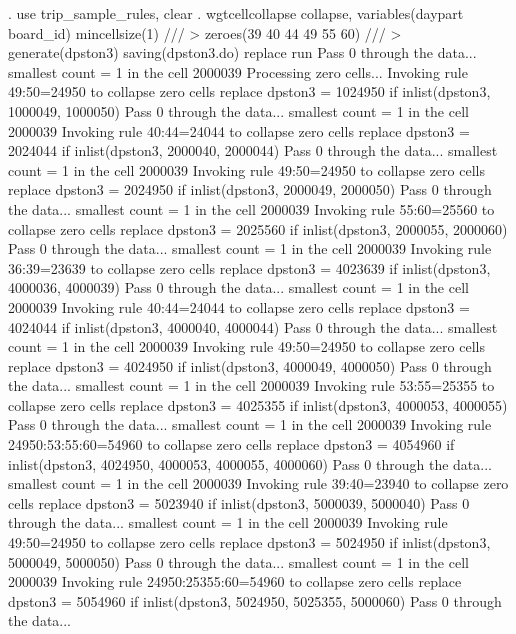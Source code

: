 . use trip_sample_rules, clear
{\smallskip}
. wgtcellcollapse collapse, variables(daypart board_id) mincellsize(1) ///
>         zeroes(39 40 44 49 55 60) ///
>         generate(dpston3) saving(dpston3.do) replace run
Pass 0 through the data...
  smallest count = 1 in the cell      2000039
{\smallskip}
Processing zero cells...
{\smallskip}
  Invoking rule 49:50=24950 to collapse zero cells
  replace dpston3 = 1024950 if inlist(dpston3, 1000049, 1000050)
Pass 0 through the data...
  smallest count = 1 in the cell      2000039
  Invoking rule 40:44=24044 to collapse zero cells
  replace dpston3 = 2024044 if inlist(dpston3, 2000040, 2000044)
Pass 0 through the data...
  smallest count = 1 in the cell      2000039
  Invoking rule 49:50=24950 to collapse zero cells
  replace dpston3 = 2024950 if inlist(dpston3, 2000049, 2000050)
Pass 0 through the data...
  smallest count = 1 in the cell      2000039
  Invoking rule 55:60=25560 to collapse zero cells
  replace dpston3 = 2025560 if inlist(dpston3, 2000055, 2000060)
Pass 0 through the data...
  smallest count = 1 in the cell      2000039
  Invoking rule 36:39=23639 to collapse zero cells
  replace dpston3 = 4023639 if inlist(dpston3, 4000036, 4000039)
Pass 0 through the data...
  smallest count = 1 in the cell      2000039
  Invoking rule 40:44=24044 to collapse zero cells
  replace dpston3 = 4024044 if inlist(dpston3, 4000040, 4000044)
Pass 0 through the data...
  smallest count = 1 in the cell      2000039
  Invoking rule 49:50=24950 to collapse zero cells
  replace dpston3 = 4024950 if inlist(dpston3, 4000049, 4000050)
Pass 0 through the data...
  smallest count = 1 in the cell      2000039
  Invoking rule 53:55=25355 to collapse zero cells
  replace dpston3 = 4025355 if inlist(dpston3, 4000053, 4000055)
Pass 0 through the data...
  smallest count = 1 in the cell      2000039
  Invoking rule 24950:53:55:60=54960 to collapse zero cells
  replace dpston3 = 4054960 if inlist(dpston3, 4024950, 4000053, 4000055, 4000060)
Pass 0 through the data...
  smallest count = 1 in the cell      2000039
  Invoking rule 39:40=23940 to collapse zero cells
  replace dpston3 = 5023940 if inlist(dpston3, 5000039, 5000040)
Pass 0 through the data...
  smallest count = 1 in the cell      2000039
  Invoking rule 49:50=24950 to collapse zero cells
  replace dpston3 = 5024950 if inlist(dpston3, 5000049, 5000050)
Pass 0 through the data...
  smallest count = 1 in the cell      2000039
  Invoking rule 24950:25355:60=54960 to collapse zero cells
  replace dpston3 = 5054960 if inlist(dpston3, 5024950, 5025355, 5000060)
Pass 0 through the data...
